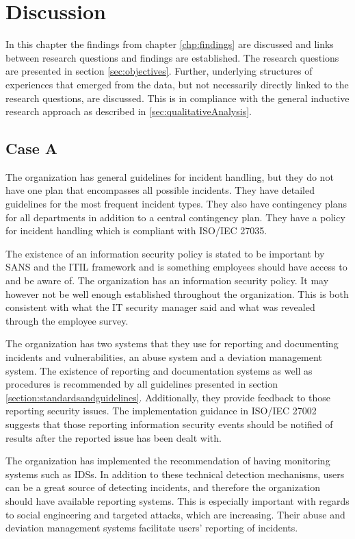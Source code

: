 \chapter{Discussion}
\label{chp:discussion}
In this chapter the findings from chapter \ref{chp:findings} are discussed and links between research questions and findings are established. The research questions are presented in section \ref{sec:objectives}. Further, underlying structures of experiences that emerged from the data, but not necessarily directly linked to the research questions, are discussed. This is in compliance with the general inductive research approach as described in \ref{sec:qualitativeAnalysis}.  

\section{Case A}
The organization has general guidelines for incident handling, but they do not have one plan that encompasses all possible incidents. They have detailed guidelines for the most frequent incident types. They also have contingency plans for all departments in addition to a central contingency plan. They have a policy for incident handling which is compliant with ISO/IEC 27035. 

The existence of an information security policy is stated to be important by SANS and the \acs{ITIL} framework and is something employees should have access to and be aware of. The organization has an information security policy. It may however not be well enough established throughout the organization. This is both consistent with what the IT security manager said and what was revealed through the employee survey.

The organization has two systems that they use for reporting and documenting incidents and vulnerabilities, an abuse system and a deviation management system. The existence of reporting and documentation systems as well as procedures is recommended by all guidelines presented in section \ref{section:standardsandguidelines}. Additionally, they provide feedback to those reporting security issues. The implementation guidance in ISO/IEC 27002 suggests that those reporting information security events should be notified of results after the reported issue has been dealt with. 

The organization has implemented the recommendation of having monitoring systems such as IDSs. In addition to these technical detection mechanisms, users can be a great source of detecting incidents, and therefore the organization should have available reporting systems. This is especially important with regards to social engineering and targeted attacks, which are increasing. Their abuse and deviation management systems facilitate users' reporting of incidents. 

